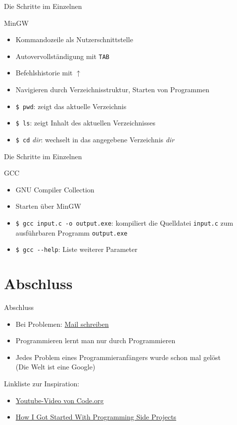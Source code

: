 \documentclass[10pt]{beamer} %
\begin{document}
\begin{frame}{Die Schritte im Einzelnen}
	
	MinGW
	\begin{itemize}
		\item Kommandozeile als Nutzerschnittstelle
		\item Autovervollständigung mit \texttt{TAB}
		\item Befehlshistorie mit $\uparrow$
		\item Navigieren durch Verzeichnisstruktur, Starten von Programmen
		\item \texttt{\$ pwd}: zeigt das aktuelle Verzeichnis
		\item \texttt{\$ ls}: zeigt Inhalt des aktuellen Verzeichnisses
		\item \texttt{\$ cd} \textsl{dir}: wechselt in das angegebene Verzeichnis \textsl{dir}
	\end{itemize}	
	
\end{frame}

\begin{frame}[fragile]{Die Schritte im Einzelnen}
	
	GCC
	\begin{itemize}
		\item GNU Compiler Collection
		\item Starten über MinGW
		\item \verb|$ gcc input.c -o output.exe|: kompiliert die Quelldatei \texttt{input.c} zum ausführbaren Programm \texttt{output.exe}
		\item \verb|$ gcc --help|: Liste weiterer Parameter
	\end{itemize}	
	
\end{frame}

\section{Abschluss}

\begin{frame}{Abschluss}
	
	\begin{itemize}
		\item Bei Problemen: \href{mailto:tom.warnke@uni-rostock.de}{Mail schreiben}
		\item Programmieren lernt man nur durch Programmieren
		\item Jedes Problem eines Programmieranfängers wurde schon mal gelöst\\(Die Welt ist eine Google)
	\end{itemize}
	
	Linkliste zur Inspiration:
	\begin{itemize}
		\item \href{https://www.youtube.com/watch?v=nKIu9yen5nc}{Youtube-Video von Code.org}
		\item \href{http://antrikshy.com/blog/how-i-got-started-with-programming-side-projects}{How I Got Started With Programming Side Projects}
	\end{itemize}
	
\end{frame}
\end{document}
